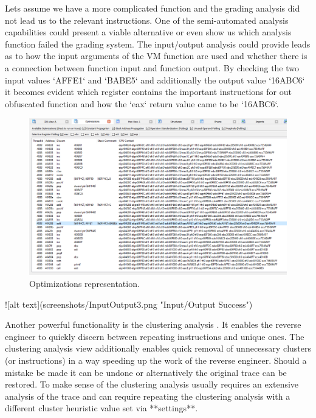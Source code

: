 \documentclass[10pt,twoside,a4paper,bibliography=totoc]{scrbook}
\begin{document}
Lets assume we have a more complicated function and the  grading analysis  did not lead us to the relevant instructions.
One of the  semi-automated analysis  capabilities could present a viable alternative or even show us which analysis function failed the grading system.
The  input/output analysis  could provide leads as to how the input arguments of the VM function are used and whether there is a connection between function input and function output. By checking the two input values `AFFE1` and `BABE5` and additionally the output value `16ABC6` it becomes evident which register contains the important instructions for out obfuscated function and how the `eax` return value came to be `16ABC6`.


\begin{figure}[htp]
\centering
\includegraphics[scale=0.55]{images/ch3/optimizations_success.png}
\caption{Optimizations representation.}
\label{opti_add_success}
\end{figure}
![alt text](screenshots/InputOutput3.png "Input/Output Success")

Another powerful functionality is the  clustering analysis . It enables the reverse engineer to quickly discern between repeating instructions and unique ones. The  clustering analysis view  additionally enables quick removal of unnecessary clusters (or instructions) in a way speeding up the work of the reverse engineer. Should a mistake be made it can be undone or alternatively the original trace can be restored. To make sense of the clustering analysis usually requires an extensive analysis of the trace and can require repeating the clustering analysis with a different cluster heuristic value set via **settings**.
\end{document}
